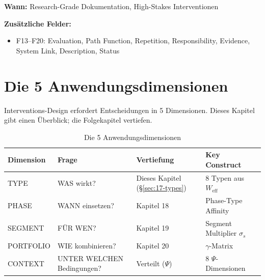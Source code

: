 \begin{tcolorbox}[colback=blue!5!white, colframe=blue!75!black,
    title=Profound Mode: F1--F20 (60 Minuten)]
\textbf{Wann:} Research-Grade Dokumentation, High-Stakes Interventionen

\textbf{Zusätzliche Felder:}
\begin{itemize}[nosep]
\item F13--F20: Evaluation, Path Function, Repetition, Responsibility, Evidence, System Link, Description, Status
\end{itemize}
\end{tcolorbox}



\section{Die 5 Anwendungsdimensionen}
\label{sec:17-dimensions}

Interventions-Design erfordert Entscheidungen in 5 Dimensionen. Dieses Kapitel gibt einen Überblick; die Folgekapitel vertiefen.

\begin{table}[htbp]
\centering
\caption{Die 5 Anwendungsdimensionen}
\label{tab:17-dimensions}
\renewcommand{\arraystretch}{1.3}
\begin{tabular}{@{}llll@{}}
\toprule
\textbf{Dimension} & \textbf{Frage} & \textbf{Vertiefung} & \textbf{Key Construct} \\
\midrule
TYPE & WAS wirkt? & Dieses Kapitel (§\ref{sec:17-types}) & 8 Typen aus $W_{\text{eff}}$ \\
PHASE & WANN einsetzen? & Kapitel 18 & Phase-Type Affinity \\
SEGMENT & FÜR WEN? & Kapitel 19 & Segment Multiplier $\sigma_s$ \\
PORTFOLIO & WIE kombinieren? & Kapitel 20 & $\gamma$-Matrix \\
CONTEXT & UNTER WELCHEN Bedingungen? & Verteilt ($\Psi$) & 8 $\Psi$-Dimensionen \\
\bottomrule
\end{tabular}
\end{table}


